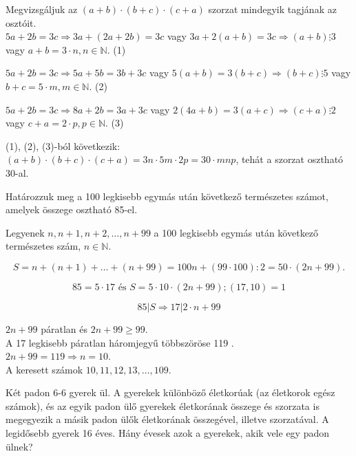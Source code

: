 \begin{solution}
Megvizsgáljuk az $(a+b)\cdot(b+c)\cdot(c+a)$ szorzat mindegyik tagjának
az osztóit.\\
 $5a+2b=3c\Rightarrow3a+(2a+2b)=3c$ vagy $3a+2(a+b)=3c\Rightarrow(a+b)\vdots3$
vagy $a+b=3\cdot n,n\in\mathbb{N}$. (1)

$5a+2b=3c\Rightarrow5a+5b=3b+3c$ vagy $5(a+b)=3(b+c)\Rightarrow(b+c)\vdots5$
vagy $b+c=5\cdot m,m\in\mathbb{N}$. (2)

$5a+2b=3c\Rightarrow8a+2b=3a+3c$ vagy $2(4a+b)=3(a+c)\Rightarrow(c+a)\vdots2$
vagy $c+a=2\cdot p,p\in\mathbb{N}$. (3)

(1), (2), (3)-ból következik:\\
 $(a+b)\cdot(b+c)\cdot(c+a)=3n\cdot5m\cdot2p=30\cdot mnp$, tehát
a szorzat osztható 30-al.\\
 
\end{solution}
\begin{extraproblem}
Határozzuk meg a 100 legkisebb egymás után következő természetes
számot, amelyek összege osztható 85-el. 
\end{extraproblem}

\begin{solution}
Legyenek $n,n+1,n+2,\ldots,n+99$ a 100 legkisebb egymás után következő
természetes szám, $n\in\mathbb{N}$.

\[
S=n+(n+1)+\ldots+(n+99)=100n+(99\cdot100):2=50\cdot(2n+99).
\]

\[
85=5\cdot17\text{ és }S=5\cdot10\cdot(2n+99);(17,10)=1
\]

\[
85|S\Rightarrow17|2\cdot n+99
\]

$2n+99$ páratlan és $2n+99\geq99$.\\
 A 17 legkisebb páratlan háromjegyű többszöröse 119 .\\
 $2n+99=119\Rightarrow n=10$.\\
 A keresett számok $10,11,12,13,\ldots,109$. 
\end{solution}
\begin{extraproblem}
Két padon 6-6 gyerek ül. A gyerekek különböző életkorúak (az életkorok
egész számok), és az egyik padon ülő gyerekek életkorának összege
és szorzata is megegyezik a másik padon ülők életkorának összegével,
illetve szorzatával. A legidősebb gyerek 16 éves. Hány évesek azok
a gyerekek, akik vele egy padon ülnek? 
\end{extraproblem}

